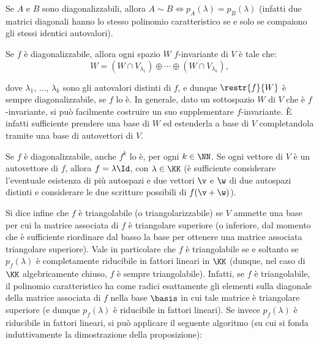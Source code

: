 \documentclass[10pt,landscape]{article}
\begin{document}
\begin{multicols}{3}
		Se $A$ e $B$ sono diagonalizzabili, allora $A \sim B \iff p_A(\lambda) =
		p_B(\lambda)$ (infatti due matrici diagonali hanno lo stesso polinomio
		caratteristico se e solo se compaiono gli stessi identici autovalori).
		
		Se $f$ è diagonalizzabile, allora ogni spazio $W$ $f$-invariante di
		$V$ è tale che:
		\[ W = (W \cap V_{\lambda_1}) \oplus \cdots \oplus (W \cap V_{\lambda_k}), \]
		
		dove $\lambda_1$, ..., $\lambda_k$ sono gli autovalori distinti di
		$f$, e dunque $\restr{f}{W}$ è sempre diagonalizzabile, se $f$ lo è.
		In generale, dato un sottospazio $W$ di $V$ che
		è $f$-invariante, si può facilmente costruire un suo
		supplementare $f$-invariante. È infatti sufficiente
		prendere una base di $W$ ed estenderla a base di $V$
		completandola tramite una base di autovettori di $V$.
		
		Se $f$ è diagonalizzabile, anche $f^k$ lo è, per ogni $k \in \NN$. Se
		ogni vettore di $V$ è un autovettore di $f$, allora $f = \lambda \Id$,
		con $\lambda \in \KK$ (è sufficiente considerare l'eventuale esistenza di più
		autospazi e due vettori $\v$ e $\w$ di due autospazi distinti e considerare
		le due scritture possibili di $f(\v + \w)$).
		
		Si dice infine che $f$ è triangolabile (o triangolarizzabile) se $V$
		ammette una base per cui la matrice associata di $f$ è triangolare superiore
		(o inferiore, dal momento che è sufficiente riordinare dal basso la base
		per ottenere una matrice associata triangolare superiore). Vale in particolare
		che $f$ è triangolabile se e soltanto se $p_f(\lambda)$ è completamente
		riducibile in fattori lineari in $\KK$ (dunque, nel caso di $\KK$ algebricamente
		chiuso, $f$ è sempre triangolabile). Infatti, se $f$ è triangolabile, il polinomio
		caratteristico ha come radici esattamente gli elementi sulla diagonale della
		matrice associata di $f$ nella base $\basis$ in cui tale matrice è triangolare
		superiore (e dunque $p_f(\lambda)$ è riducibile in fattori lineari). Se invece $p_f(\lambda)$ è riducibile in fattori lineari, si può applicare il seguente
		algoritmo (su cui si fonda induttivamente la dimostrazione della proposizione):
		

\end{multicols}
\end{document}
